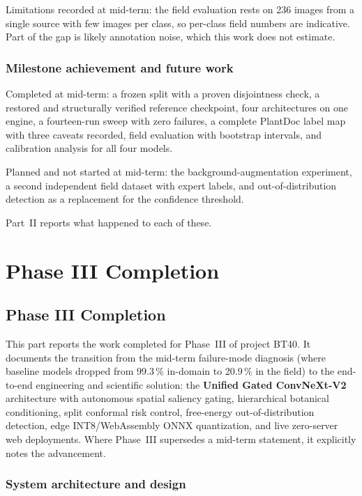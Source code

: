 \documentclass[12pt,a4paper]{report}
\begin{document}
Limitations recorded at mid-term: the field evaluation rests on 236 images from a
single source with few images per class, so per-class field numbers are indicative.
Part of the gap is likely annotation noise, which this work does not estimate.

\section{Milestone achievement and future work}

Completed at mid-term: a frozen split with a proven disjointness check, a restored
and structurally verified reference checkpoint, four architectures on one engine, a
fourteen-run sweep with zero failures, a complete PlantDoc label map with three
caveats recorded, field evaluation with bootstrap intervals, and calibration analysis
for all four models.

Planned and not started at mid-term: the background-augmentation experiment, a second
independent field dataset with expert labels, and out-of-distribution detection as a
replacement for the confidence threshold.

Part~II reports what happened to each of these.


\part{Phase III Completion}
\chapter{Phase III Completion}

This part reports the work completed for Phase~III of project BT40. It documents the
transition from the mid-term failure-mode diagnosis (where baseline models dropped from
99.3\,\% in-domain to 20.9\,\% in the field) to the end-to-end engineering and scientific
solution: the \textbf{Unified Gated ConvNeXt-V2} architecture with autonomous spatial
saliency gating, hierarchical botanical conditioning, split conformal risk control,
free-energy out-of-distribution detection, edge INT8/WebAssembly ONNX quantization, and
live zero-server web deployments. Where Phase~III supersedes a mid-term statement, it
explicitly notes the advancement.

\section{System architecture and design}
\end{document}
